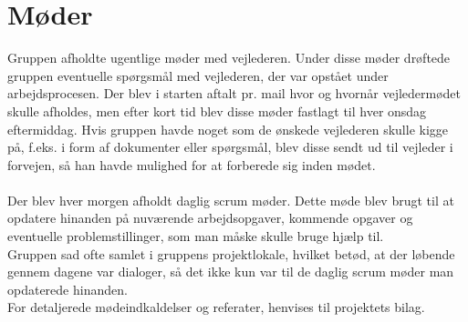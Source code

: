 \section{Møder}
Gruppen afholdte ugentlige møder med vejlederen. Under disse møder drøftede gruppen eventuelle spørgsmål med vejlederen, der var opstået under arbejdsprocesen.
Der blev i starten aftalt pr. mail hvor og hvornår vejledermødet skulle afholdes, men efter kort tid blev disse møder fastlagt til hver onsdag eftermiddag.
Hvis gruppen havde noget som de ønskede vejlederen skulle kigge på, f.eks. i form af dokumenter eller spørgsmål, blev disse sendt ud til vejleder i forvejen, så han havde mulighed for at forberede sig inden mødet. \\ \\
Der blev hver morgen afholdt daglig scrum møder\cite{Scrum}. Dette møde blev brugt til at opdatere hinanden på nuværende arbejdsopgaver, kommende opgaver og eventuelle problemstillinger, som man måske skulle bruge hjælp til. \\
Gruppen sad ofte samlet i gruppens projektlokale, hvilket betød, at der løbende gennem dagene var dialoger, så det ikke kun var til de daglig scrum møder man opdaterede hinanden. \\
For detaljerede mødeindkaldelser og referater, henvises til projektets bilag. \\

\clearpage

